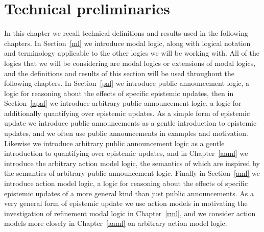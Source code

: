 \chapter{Technical preliminaries}\label{technical}

In this chapter we recall technical definitions and results used in the following chapters.
In Section~\ref{ml} we introduce modal logic, along with logical notation and terminology applicable to the other logics we will be working with.
All of the logics that we will be considering are modal logics or extensions of modal logics, and the definitions and results of this section will be used throughout the following chapters. 
In Section~\ref{pal} we introduce public announcement logic, a logic for reasoning about the effects of specific epistemic updates, then in Section~\ref{apal} we introduce arbitrary public announcement logic, a logic for additionally quantifying over epistemic updates.
As a simple form of epistemic update we introduce public announcements as a gentle introduction to epistemic updates, and we often use public announcements in examples and motivation.
Likewise we introduce arbitrary public announcement logic as a gentle introduction to quantifying over epistemic updates, and in Chapter~\ref{aaml} we introduce the arbitrary action model logic, the semantics of which are inspired by the semantics of arbitrary public announcement logic.
Finally in Section~\ref{aml} we introduce action model logic, a logic for reasoning about the effects of specific epistemic updates of a more general kind than just public announcements.
As a very general form of epistemic update we use action models in motivating the investigation of refinement modal logic in Chapter~\ref{rml}, and we consider action models more closely in Chapter~\ref{aaml} on arbitrary action model logic.





